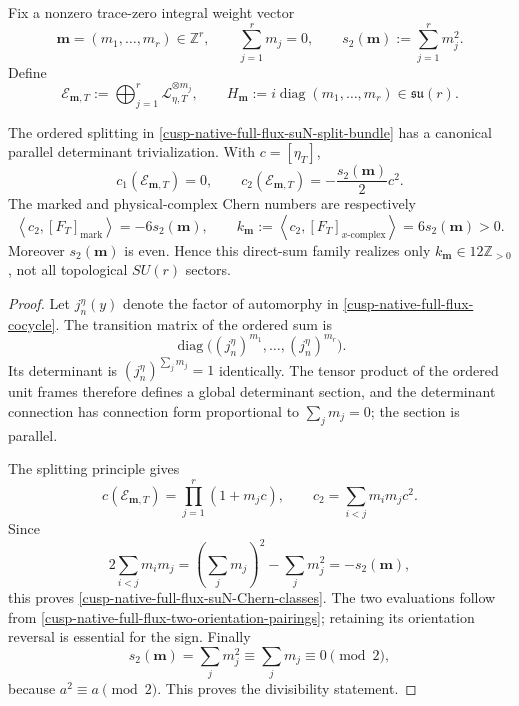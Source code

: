 Fix a nonzero trace-zero integral weight vector
\begin{equation}
 \mathbf m=(m_1,\ldots,m_r)\in\mathbb Z^r,
 \qquad \sum_{j=1}^r m_j=0,
 \qquad s_2(\mathbf m):=\sum_{j=1}^r m_j^2.
 \label{cusp-native-full-flux-suN-weight-vector}
\end{equation}
Define
\begin{equation}
 \mathscr E_{\mathbf m,T}:=
 \bigoplus_{j=1}^r\mathscr L_{\eta,T}^{\otimes m_j},
 \qquad
 H_{\mathbf m}:=i\operatorname{diag}(m_1,\ldots,m_r)
 \in\mathfrak{su}(r).
 \label{cusp-native-full-flux-suN-split-bundle}
\end{equation}

\begin{proposition}
\label{cusp-native-full-flux-suN-topology}
The ordered splitting in
\cref{cusp-native-full-flux-suN-split-bundle} has a canonical parallel
determinant trivialization.  With \(c=[\eta_T]\),
\begin{equation}
 c_1(\mathscr E_{\mathbf m,T})=0,
 \qquad
 c_2(\mathscr E_{\mathbf m,T})
 =-\frac{s_2(\mathbf m)}2c^2.
 \label{cusp-native-full-flux-suN-Chern-classes}
\end{equation}
The marked and physical-complex Chern numbers are respectively
\begin{equation}
 \left\langle c_2,[F_T]_{\mathrm{mark}}\right\rangle=-6s_2(\mathbf m),
 \qquad
 k_{\mathbf m}:=
 \left\langle c_2,[F_T]_{x\text{-}\mathrm{complex}}\right\rangle
 =6s_2(\mathbf m)>0.
 \label{cusp-native-full-flux-suN-Chern-numbers}
\end{equation}
Moreover \(s_2(\mathbf m)\) is even.  Hence this direct-sum family realizes
only \(k_{\mathbf m}\in12\mathbb Z_{>0}\), not all topological \(SU(r)\)
sectors.
\end{proposition}

\begin{proof}
Let \(j_n^\eta(y)\) denote the factor of automorphy in
\cref{cusp-native-full-flux-cocycle}.  The transition matrix of the ordered
sum is
\[
 \operatorname{diag}\bigl((j_n^\eta)^{m_1},\ldots,
 (j_n^\eta)^{m_r}\bigr).
\]
Its determinant is \((j_n^\eta)^{\sum_j m_j}=1\) identically.  The tensor
product of the ordered unit frames therefore defines a global determinant
section, and the determinant connection has connection form proportional to
\(\sum_j m_j=0\); the section is parallel.

The splitting principle gives
\[
 c(\mathscr E_{\mathbf m,T})=\prod_{j=1}^r(1+m_j c),
 \qquad
 c_2=\sum_{i<j}m_i m_j c^2.
\]
Since
\[
 2\sum_{i<j}m_i m_j
 =\left(\sum_j m_j\right)^2-\sum_j m_j^2=-s_2(\mathbf m),
\]
this proves \cref{cusp-native-full-flux-suN-Chern-classes}.  The two
evaluations follow from
\cref{cusp-native-full-flux-two-orientation-pairings}; retaining its
orientation reversal is essential for the sign.  Finally
\[
 s_2(\mathbf m)=\sum_j m_j^2\equiv\sum_j m_j\equiv0\pmod2,
\]
because \(a^2\equiv a\pmod2\).  This proves the divisibility statement.
\end{proof}

